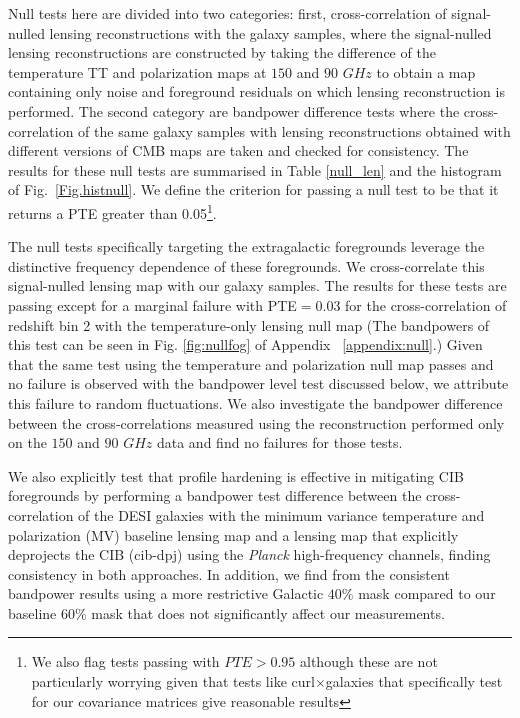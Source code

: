 \documentclass[twocolumn]{aastex631}
\begin{document}
{Null tests here are divided into two categories: first, cross-correlation of signal-nulled lensing reconstructions with the galaxy samples, where the signal-nulled lensing reconstructions are constructed  by taking the difference of the temperature  TT and polarization maps at $150$ and $90$ $\si{GHz}$ to obtain a map containing only noise and foreground residuals on which lensing reconstruction is performed.  The second category are bandpower difference tests where the cross-correlation of the same galaxy samples with lensing reconstructions obtained with different versions of CMB maps are taken and checked for consistency. 
The results for these null tests are summarised in Table \ref{null_len} and the histogram of Fig.~\ref{Fig.histnull}. We define the criterion for passing a null test to be that it returns a PTE greater than 0.05\footnote{We also flag tests passing with $PTE>0.95$ although these are not particularly worrying given that tests like curl$\times${galaxies} that specifically test for our covariance matrices give reasonable results}. 

The null tests specifically targeting the extragalactic foregrounds leverage the distinctive frequency dependence of these foregrounds. We  cross-correlate this signal-nulled lensing map with our galaxy samples. 
The results for these tests are passing except for a marginal failure with PTE$=0.03$ for the cross-correlation of redshift bin 2 with the temperature-only lensing null map (The bandpowers of this test can be seen in Fig. \ref{fig:nullfog} of Appendix ~\ref{appendix:null}.)  Given that the same test using the temperature and polarization null map passes and no failure is observed with the bandpower level test discussed below, we attribute this failure to random fluctuations. We also investigate the bandpower difference between the cross-correlations measured using the reconstruction performed only on the $150$ and $90$ $\si{GHz}$ data and find no failures for those tests.

We also explicitly test that profile hardening is effective in mitigating CIB foregrounds by performing a bandpower test difference between the cross-correlation of the DESI galaxies with the minimum variance temperature and polarization (MV) baseline lensing map and a lensing map that explicitly deprojects the CIB (cib-dpj) using the \textit{Planck} high-frequency channels, finding consistency in both approaches. In addition, we find from the consistent bandpower results using a more restrictive Galactic $40\%$ mask compared to our baseline $60\%$ mask that does not significantly affect our measurements.


}
\end{document}
